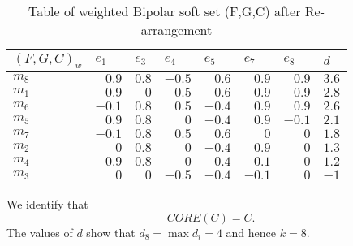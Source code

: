 \documentclass{amsart}
\theoremstyle{plain}
\numberwithin{equation}{section}
\begin{document}
\begin{table}[h] \centering\begin{tabular}{||l||l|l|l|l|l|l|l|}
\hline\hline
$(F,G,C)_{w}$ & $e_{1}$ & \multicolumn{1}{||l|}{$e_{3}$} & 
\multicolumn{1}{||l|}{$e_{4}$} & \multicolumn{1}{||l|}{$e_{5}$} & 
\multicolumn{1}{||l|}{$e_{7}$} & \multicolumn{1}{||l|}{$e_{8}$} & 
\multicolumn{1}{||l||}{$d$} \\ \hline\hline
$m_{8}$ & \multicolumn{1}{||r|}{$0.9$} & \multicolumn{1}{|r|}{$0.8$} & 
\multicolumn{1}{|r|}{$-0.5$} & \multicolumn{1}{|r|}{$0.6$} & 
\multicolumn{1}{|r|}{$0.9$} & \multicolumn{1}{|r|}{$0.9$} & 
\multicolumn{1}{|r|}{$3.6$} \\ \hline\hline
$m_{1}$ & \multicolumn{1}{||r|}{$0.9$} & \multicolumn{1}{|r|}{$0$} & 
\multicolumn{1}{|r|}{$-0.5$} & \multicolumn{1}{|r|}{$0.6$} & 
\multicolumn{1}{|r|}{$0.9$} & \multicolumn{1}{|r|}{$0.9$} & 
\multicolumn{1}{|r|}{$2.8$} \\ \hline\hline
$m_{6}$ & \multicolumn{1}{||r|}{$-0.1$} & \multicolumn{1}{|r|}{$0.8$} & 
\multicolumn{1}{|r|}{$0.5$} & \multicolumn{1}{|r|}{$-0.4$} & 
\multicolumn{1}{|r|}{$0.9$} & \multicolumn{1}{|r|}{$0.9$} & 
\multicolumn{1}{|r|}{$2.6$} \\ \hline\hline
$m_{5}$ & \multicolumn{1}{||r|}{$0.9$} & \multicolumn{1}{|r|}{$0.8$} & 
\multicolumn{1}{|r|}{$0$} & \multicolumn{1}{|r|}{$-0.4$} & 
\multicolumn{1}{|r|}{$0.9$} & \multicolumn{1}{|r|}{$-0.1$} & 
\multicolumn{1}{|r|}{$2.1$} \\ \hline\hline
$m_{7}$ & \multicolumn{1}{||r|}{$-0.1$} & \multicolumn{1}{|r|}{$0.8$} & 
\multicolumn{1}{|r|}{$0.5$} & \multicolumn{1}{|r|}{$0.6$} & 
\multicolumn{1}{|r|}{$0$} & \multicolumn{1}{|r|}{$0$} & \multicolumn{1}{|r|}{$1.8$} \\ \hline\hline
$m_{2}$ & \multicolumn{1}{||r|}{$0$} & \multicolumn{1}{|r|}{$0.8$} & 
\multicolumn{1}{|r|}{$0$} & \multicolumn{1}{|r|}{$-0.4$} & 
\multicolumn{1}{|r|}{$0.9$} & \multicolumn{1}{|r|}{$0$} & 
\multicolumn{1}{|r|}{$1.3$} \\ \hline\hline
$m_{4}$ & \multicolumn{1}{||r|}{$0.9$} & \multicolumn{1}{|r|}{$0.8$} & 
\multicolumn{1}{|r|}{$0$} & \multicolumn{1}{|r|}{$-0.4$} & 
\multicolumn{1}{|r|}{$-0.1$} & \multicolumn{1}{|r|}{$0$} & 
\multicolumn{1}{|r|}{$1.2$} \\ \hline\hline
$m_{3}$ & \multicolumn{1}{||r|}{$0$} & \multicolumn{1}{|r|}{$0$} & 
\multicolumn{1}{|r|}{$-0.5$} & \multicolumn{1}{|r|}{$-0.4$} & 
\multicolumn{1}{|r|}{$-0.1$} & \multicolumn{1}{|r|}{$0$} & 
\multicolumn{1}{|r|}{$-1$} \\ \hline\hline
\end{tabular}\caption{Table of weighted Bipolar soft set (F,G,C) after Re-arrangement }\label{TableKey copy(6)}\end{table}
We identify that\begin{equation*}
CORE(C)=C\text{.}
\end{equation*}The values of $d$ show that $d_{8}=\max d_{i}=4$ and hence $k=8$.
\end{document}

